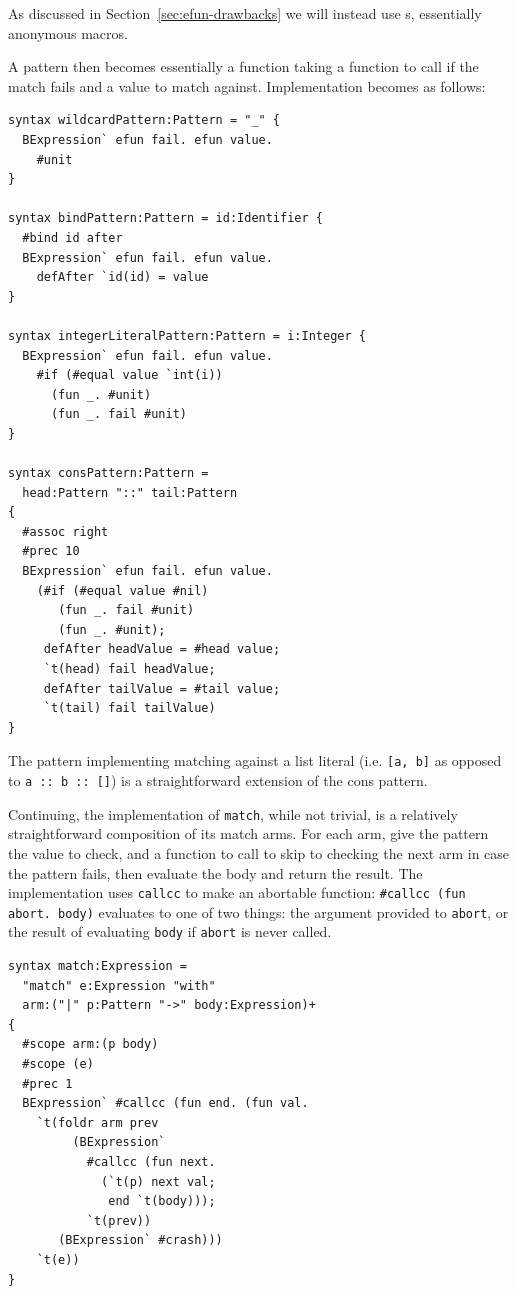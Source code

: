 \documentclass{kththesis}
\begin{document}
As discussed in Section~\ref{sec:efun-drawbacks} we will instead use s, essentially anonymous macros.

A pattern then becomes essentially a function taking a function to call if the match fails and a value to match against. Implementation becomes as follows:

\begin{verbatim}
syntax wildcardPattern:Pattern = "_" {
  BExpression` efun fail. efun value.
    #unit
}

syntax bindPattern:Pattern = id:Identifier {
  #bind id after
  BExpression` efun fail. efun value.
    defAfter `id(id) = value
}

syntax integerLiteralPattern:Pattern = i:Integer {
  BExpression` efun fail. efun value.
    #if (#equal value `int(i))
      (fun _. #unit)
      (fun _. fail #unit)
}

syntax consPattern:Pattern =
  head:Pattern "::" tail:Pattern
{
  #assoc right
  #prec 10
  BExpression` efun fail. efun value.
    (#if (#equal value #nil)
       (fun _. fail #unit)
       (fun _. #unit);
     defAfter headValue = #head value;
     `t(head) fail headValue;
     defAfter tailValue = #tail value;
     `t(tail) fail tailValue)
}
\end{verbatim}

The pattern implementing matching against a list literal (i.e. \texttt{[a, b]} as opposed to \texttt{a :: b :: []}) is a straightforward extension of the cons pattern.

Continuing, the implementation of \texttt{match}, while not trivial, is a relatively straightforward composition of its match arms. For each arm, give the pattern the value to check, and a function to call to skip to checking the next arm in case the pattern fails, then evaluate the body and return the result. The implementation uses \texttt{callcc} to make an abortable function: \texttt{#callcc (fun abort. body)} evaluates to one of two things: the argument provided to \texttt{abort}, or the result of evaluating \texttt{body} if \texttt{abort} is never called.

\begin{verbatim}
syntax match:Expression =
  "match" e:Expression "with"
  arm:("|" p:Pattern "->" body:Expression)+
{
  #scope arm:(p body)
  #scope (e)
  #prec 1
  BExpression` #callcc (fun end. (fun val.
    `t(foldr arm prev
         (BExpression`
           #callcc (fun next.
             (`t(p) next val;
              end `t(body)));
           `t(prev))
       (BExpression` #crash)))
    `t(e))
}
\end{verbatim}
\end{document}
